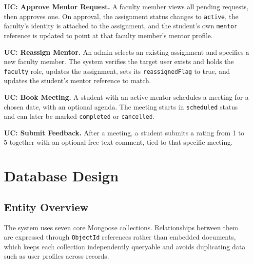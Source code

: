 \documentclass[12pt,a4paper]{report}
\newcommand{\sectionrule}{\vspace{-4pt}{\color{lightgray}\hrule height 1pt}\vspace{8pt}}
\begin{document}
\textbf{UC: Approve Mentor Request.} A faculty member views all pending requests, then approves one. On approval, the assignment status changes to \texttt{active}, the faculty's identity is attached to the assignment, and the student's own \texttt{mentor} reference is updated to point at that faculty member's mentor profile.

\textbf{UC: Reassign Mentor.} An admin selects an existing assignment and specifies a new faculty member. The system verifies the target user exists and holds the \texttt{faculty} role, updates the assignment, sets its \texttt{reassignedFlag} to true, and updates the student's mentor reference to match.

\textbf{UC: Book Meeting.} A student with an active mentor schedules a meeting for a chosen date, with an optional agenda. The meeting starts in \texttt{scheduled} status and can later be marked \texttt{completed} or \texttt{cancelled}.

\textbf{UC: Submit Feedback.} After a meeting, a student submits a rating from 1 to 5 together with an optional free-text comment, tied to that specific meeting.

\chapter{Database Design}

\section{Entity Overview}
\sectionrule
The system uses seven core Mongoose collections. Relationships between them are expressed through \texttt{ObjectId} references rather than embedded documents, which keeps each collection independently queryable and avoids duplicating data such as user profiles across records.
\end{document}
